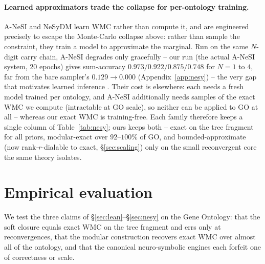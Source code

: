 \documentclass[anon]{nesy2026}
\newcommand{\WMC}{\ensuremath{\mathrm{WMC}}}
\begin{document}
\paragraph{Learned approximators trade the collapse for per-ontology training.}
A-NeSI \citep{vankrieken2023anesi} and NeSyDM \citep{vankrieken2025nesydm} learn $\WMC$ rather than
compute it, and are engineered precisely to escape the Monte-Carlo collapse above: rather than
sample the constraint, they train a model to approximate the marginal. Run on the same $N$-digit
carry chain, A-NeSI degrades only gracefully -- our run (the actual A-NeSI system, $20$ epochs)
gives sum-accuracy $0.973/0.922/0.875/0.748$ for $N{=}1$ to $4$, far from the bare sampler's
$0.129\!\to\!0.000$ (Appendix~\ref{app:nesy}) -- the very gap that motivates learned inference
\citep{vankrieken2024independence,marconato2023reasoningshortcuts}. Their cost is elsewhere: each
needs a fresh model trained per ontology, and A-NeSI additionally needs samples of the exact $\WMC$
we compute (intractable at GO scale), so neither can be applied to GO at all -- whereas our exact
WMC is training-free. Each family therefore keeps a single column of Table~\ref{tab:nesy}; ours keeps both -- exact on the
tree fragment for all priors, modular-exact over $92$--$100\%$ of GO, and bounded-approximate (now
rank-$r$-dialable to exact, \S\ref{sec:scaling}) only on the small reconvergent core the same theory
isolates.

\section{Empirical evaluation}\label{sec:experiments}

We test the three claims of \S\ref{sec:lean}--\S\ref{sec:nesy} on the Gene Ontology: that the
soft closure equals exact WMC on the tree fragment and errs only at reconvergences, that the
modular construction recovers exact WMC over almost all of the ontology, and that the
canonical neuro-symbolic engines each forfeit one of correctness or scale.
\end{document}
